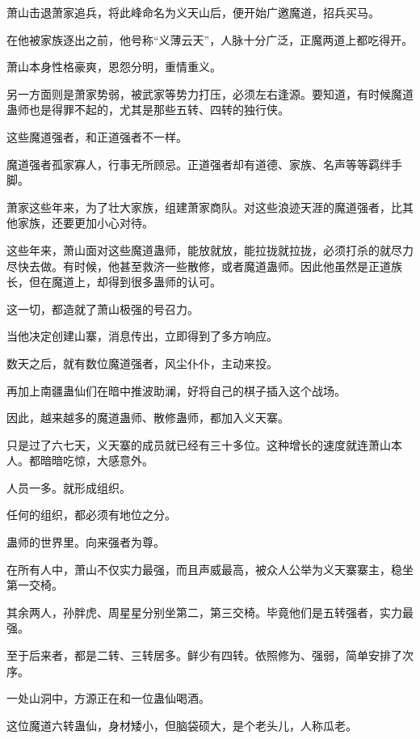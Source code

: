 
\begin{this_body}



萧山击退萧家追兵，将此峰命名为义天山后，便开始广邀魔道，招兵买马。

在他被家族逐出之前，他号称“义薄云天”，人脉十分广泛，正魔两道上都吃得开。

萧山本身性格豪爽，恩怨分明，重情重义。

另一方面则是萧家势弱，被武家等势力打压，必须左右逢源。要知道，有时候魔道蛊师也是得罪不起的，尤其是那些五转、四转的独行侠。

这些魔道强者，和正道强者不一样。

魔道强者孤家寡人，行事无所顾忌。正道强者却有道德、家族、名声等等羁绊手脚。

萧家这些年来，为了壮大家族，组建萧家商队。对这些浪迹天涯的魔道强者，比其他家族，还要更加小心对待。

这些年来，萧山面对这些魔道蛊师，能放就放，能拉拢就拉拢，必须打杀的就尽力尽快去做。有时候，他甚至救济一些散修，或者魔道蛊师。因此他虽然是正道族长，但在魔道上，却得到很多蛊师的认可。

这一切，都造就了萧山极强的号召力。

当他决定创建山寨，消息传出，立即得到了多方响应。

数天之后，就有数位魔道强者，风尘仆仆，主动来投。

再加上南疆蛊仙们在暗中推波助澜，好将自己的棋子插入这个战场。

因此，越来越多的魔道蛊师、散修蛊师，都加入义天寨。

只是过了六七天，义天寨的成员就已经有三十多位。这种增长的速度就连萧山本人。都暗暗吃惊，大感意外。

人员一多。就形成组织。

任何的组织，都必须有地位之分。

蛊师的世界里。向来强者为尊。

在所有人中，萧山不仅实力最强，而且声威最高，被众人公举为义天寨寨主，稳坐第一交椅。

其余两人，孙胖虎、周星星分别坐第二，第三交椅。毕竟他们是五转强者，实力最强。

至于后来者，都是二转、三转居多。鲜少有四转。依照修为、强弱，简单安排了次序。

一处山洞中，方源正在和一位蛊仙喝酒。

这位魔道六转蛊仙，身材矮小，但脑袋硕大，是个老头儿，人称瓜老。


\end{this_body}
